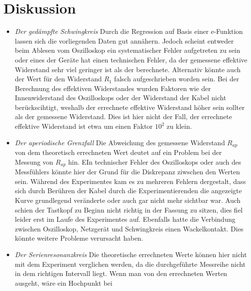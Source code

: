 \section{Diskussion}
\label{sec:Diskussion}

\begin{itemize}
  \item \textit{Der gedämpfte Schwingkreis}
  Durch die Regression auf Basis einer e-Funktion lassen sich die vorliegenden Daten gut
  annähern. Jedoch scheint entweder beim Ablesen vom Oszilloskop ein systematischer
  Fehler aufgetreten zu sein oder eines der Geräte hat einen technischen Fehler, da der
  gemessene effektive Widerstand sehr viel geringer ist als der berechnete.
  Alternativ könnte  auch der Wert für den Widerstand $R_1$ falsch aufgeschrieben worden
  sein. Bei der Berechnung des effektiven Widerstandes wurden Faktoren wie der
  Innenwiderstand des Oszilloskops oder der Widerstand der Kabel nicht berückscihtigt,
  weshalb der errechnete effektive Widerstand höher sein sollter als der gemessene
  Widerstand. Dies ist hier nicht der Fall, der errechnete effektive Widerstand ist etwa
  um einen Faktor $10^2$ zu klein.

  \item \textit{Der aperiodische Grenzfall}
  Die Abweichung des gemessene Widerstand $R_{ap}$ von dem theoretisch errechneten Wert
  deutet auf ein Problem bei der Messung von $R_{ap}$ hin. EIn technischer Fehler des
  Oszilloskops oder auch des Messfühlers könnte hier der Grund für die Diskrepanz
  ziwschen den Werten sein. Während des Experimentes kam es zu mehreren Fehlern
  dergestalt, dass sich durch Berühren der Kabel durch die Experimentierenden die
  angezeigte Kurve grundlegend veränderte oder auch gar nicht mehr sichtbar war. Auch
  schien der Tastkopf zu Beginn nicht richtig in der Fassung zu sitzen, dies fiel leider
  erst im Laufe des Experimentes auf. Ebenfalls hatte die Verbindung zwischen
  Oszilloskop, Netzgerät und Schwingkreis einen Wackelkontakt. Dies könnte weitere
  Probleme verursacht haben.

  \item \textit{Der Serienresonanzkreis}
  Die theoretische errechneten Werte können hier nicht mit dem Experiment verglichen werden, da die durchgeführte Messreihe nicht in dem richtigen Intervall liegt. Wenn man von den errechneten Werten ausgeht, wäre ein Hochpunkt bei 
\end{itemize}
